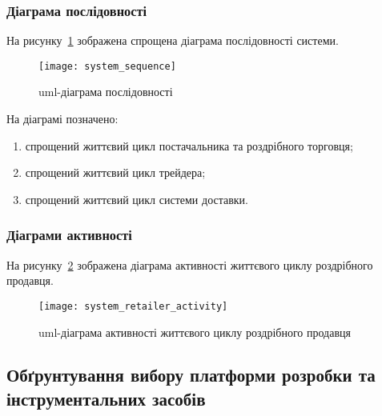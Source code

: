 \subsubsection{Діаграма послідовності}
На рисунку~\ref{fig:system_sequence} зображена спрощена діаграма послідовності системи.

\begin{figure}[H]
	\centering
	\texttt{[image: system\_sequence]}
	\caption{\acrshort{uml}-діаграма послідовності}
	\label{fig:system_sequence}
\end{figure} 

На діаграмі позначено:
\begin{enumerate}[label={\arabic*)}]
	\item спрощений життєвий цикл постачальника та роздрібного торговця;
	\item спрощений життєвий цикл трейдера;
	\item спрощений життєвий цикл системи доставки.
\end{enumerate}

\subsubsection{Діаграми активності}
На рисунку~\ref{fig:system_retailer_activity} зображена діаграма активності життєвого циклу роздрібного продавця.

\begin{figure}[H]
	\centering
	\texttt{[image: system\_retailer\_activity]}
	\caption{\acrshort{uml}-діаграма активності життєвого циклу роздрібного продавця}
	\label{fig:system_retailer_activity}
\end{figure} 

\subsection{Обґрунтування вибору платформи розробки та інструментальних засобів}
